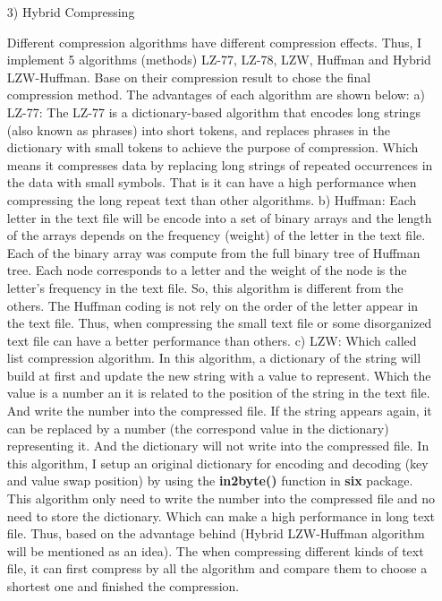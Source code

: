 \documentclass[margin 2cm]{report}
\begin{document}
\begin{enumerate}
\normalsize\item[3)]{Hybrid Compressing}
\begin{spacing}{1.5}
\normalsize\indent\setlength{\parindent}{2em}Different compression algorithms have different compression effects. Thus, I implement 5 algorithms (methods) LZ-77, LZ-78, LZW, Huffman and Hybrid LZW-Huffman. Base on their compression result to chose the final compression method. The advantages of each algorithm are shown below:
\newline\normalsize a) LZ-77:   The LZ-77 is a dictionary-based algorithm that encodes long strings (also known as phrases) into short tokens, and replaces phrases in the dictionary with small tokens to achieve the purpose of compression. Which means it compresses data by replacing long strings of repeated occurrences in the data with small symbols. That is it can have a high performance when compressing the long repeat text than other algorithms.
\newline\normalsize b) Huffman:   Each letter in the text file will be encode into a set of binary arrays and the length of the arrays depends on the frequency (weight) of the  letter in the text file. Each of the binary array was compute from the full binary tree of Huffman tree. Each node corresponds to a letter and the weight of the node is the letter's frequency in the text file. So, this algorithm is different from the others. The Huffman coding is not rely on the order of the letter appear in the text file. Thus, when compressing the small text file or some disorganized text file can have a better performance than others.
\newline\normalsize c) LZW:   Which called list compression algorithm. In this algorithm, a dictionary of the string will build at first and update the new string with a value to represent. Which the value is a number an it is related to the position of the string in the text file. And write the number into the compressed file. If the string appears again, it can be replaced by a number (the correspond value in the dictionary) representing it. And the dictionary will not write into the compressed file. In this algorithm, I setup an original dictionary for encoding and decoding (key and value swap position) by using the \textbf{in2byte()} function in \textbf{six} package. This algorithm only need to write the number into the compressed file and no need to store the dictionary. Which can make a high performance in long text file.
\newline Thus, based on the advantage behind (Hybrid LZW-Huffman algorithm will be mentioned as an idea). The when compressing different kinds of text file, it can first compress by all the algorithm and compare them to choose a shortest one and finished the compression.
\end{spacing}


\end{enumerate}
\end{document}
